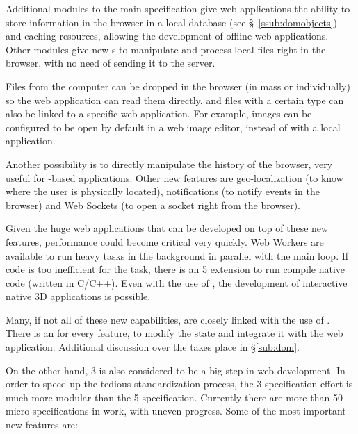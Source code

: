Additional modules to the main specification give web applications the ability to store information in the browser in a local database (see \S~\vref{ssub:domobjects}) and caching resources, allowing the development of offline web applications.
Other modules give new s to manipulate and process local files right in the browser, with no need of sending it to the server.

Files from the computer can be dropped in the browser (in mass or individually) so the web application can read them directly, and files with a certain  type can also be linked to a specific web application.
For example, images can be configured to be open by default in a web image editor, instead of with a local application.

Another possibility is to directly manipulate the history of the browser, very useful for -based applications.
Other new features are geo-localization (to know where the user is physically located), notifications (to notify events in the browser) and Web Sockets (to open a socket right from the browser).

Given the huge web applications that can be developed on top of these new features, performance could become critical very quickly.
Web Workers are available to run heavy tasks in the background in parallel with the main loop.
If  code is too inefficient for the task, there is an  5 extension to run compile native code (written in C/C++).
Even with the use of , the development of interactive native 3D applications is possible.

Many, if not all of these new capabilities, are closely linked with the use of .
There is an  for every feature, to modify the state and integrate it with the web application.
Additional discussion over the  takes place in \S\vref{sub:dom}.

On the other hand,  3 is also considered to be a big step in web development.
In order to speed up the tedious standardization process, the  3 specification effort is much more modular than the  5 specification.
Currently there are more than 50 micro-specifications in work, with uneven progress.
Some of the most important new features are:

